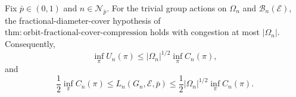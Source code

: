 Fix \(\bar p\in(0,1)\) and \(n\in\mathcal N_{\bar p}\).  For the trivial group actions on \(\Omega_n\) and \(\mathcal B_n(\mathcal E)\), the fractional-diameter-cover hypothesis of \(\mathrm{thm{:}orbit\text{-}fractional\text{-}cover\text{-}compression}\) holds with congestion at most \(|\Omega_n|\).  Consequently,
\[
 \inf_\pi U_n(\pi)
 \le |\Omega_n|^{1/2}\inf_\pi C_n(\pi),
\]
and
\[
 \frac12\inf_\pi C_n(\pi)
 \le L_n(G_n,\mathcal E,\bar p)
 \le \frac12|\Omega_n|^{1/2}\inf_\pi C_n(\pi).
\]